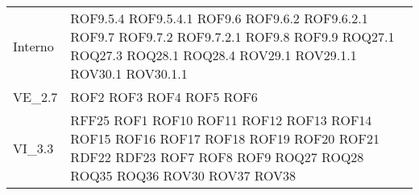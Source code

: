 \begin{longtable}{p{2.5cm}!{\VRule[1pt]}p{2.5cm}}
	Interno & ROF9.5.4 \newline ROF9.5.4.1 \newline ROF9.6 \newline ROF9.6.2 \newline ROF9.6.2.1 \newline ROF9.7 \newline ROF9.7.2 \newline ROF9.7.2.1 \newline ROF9.8 \newline ROF9.9 \newline ROQ27.1 \newline ROQ27.3 \newline ROQ28.1 \newline ROQ28.4 \newline ROV29.1 \newline ROV29.1.1 \newline ROV30.1 \newline ROV30.1.1 \\
	VE_2.7 & ROF2 \newline ROF3 \newline ROF4 \newline ROF5 \newline ROF6\\
	VI_3.3 & RFF25 \newline ROF1 \newline ROF10 \newline ROF11 \newline ROF12 \newline ROF13 \newline ROF14 \newline ROF15 \newline ROF16 \newline ROF17 \newline ROF18 \newline ROF19 \newline ROF20 \newline ROF21 \newline RDF22 \newline RDF23 \newline ROF7 \newline ROF8 \newline ROF9 \newline ROQ27 \newline ROQ28 \newline ROQ35 \newline ROQ36 \newline ROV30 \newline ROV37 \newline ROV38\\

\end{longtable}

